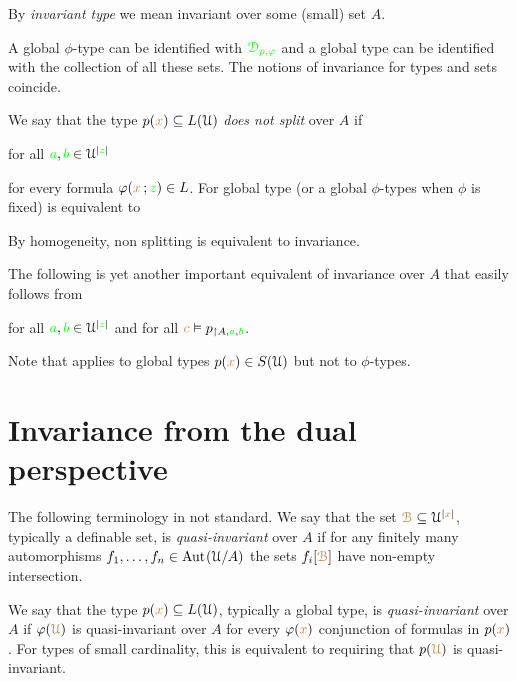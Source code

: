 \documentclass[creche.tex]{subfiles}
\begin{document}
By \emph{invariant type\/} we mean invariant over some (small) set $A$.

A global $\phi$-type can be identified with ${\color{green}\EuScript D_{p,\varphi}}$ and a global type can be identified with the collection of all these sets.
The notions of invariance for types and sets coincide.

We say that the type $p({\color{brown} x})\subseteq L(\EuScript U)$ \emph{does not split\/} over $A$ if

\hfill for all ${\color{green} a},{\color{green} b}\in\EuScript U^{|{\color{green} z}|}$

for every formula $\varphi({\color{brown} x}\,;{\color{green} z})\in L$.
For global type (or a global $\phi$-types  when $\phi$ is fixed)  is equivalent to


By homogeneity, non splitting is equivalent to invariance.

The following is yet another important equivalent of invariance over $A$ that easily follows from 

\hfill for all ${\color{green} a},{\color{green} b}\in\EuScript U^{|{\color{green} z}|}$ and for all ${\color{brown} c}\vDash p_{\restriction A,{\color{green} a},{\color{green} b}}$.

Note that  applies to global types $p({\color{brown} x})\in S(\EuScript U)$ but not to $\phi$-types.

\section{Invariance from the dual perspective}

\noindent\llap{\textcolor{red}{\Large\danger}\kern1.5ex}The following terminology in not standard.
We say that the set ${\color{brown}\EuScript B}\subseteq\EuScript U^{|{\color{brown} x}|}$, typically a definable set, is \emph{quasi-invariant\/} over $A$ if for any finitely many automorphisms $f_1,\dots,f_n\in\textrm{Aut\kern.15ex}(\EuScript U/A)$ the sets $f_i[{\color{brown}\EuScript B}]$ have non-empty intersection.

We say that the type $p({\color{brown} x})\subseteq L(\EuScript U)$, typically a global type, is \emph{quasi-invariant\/} over $A$ if $\varphi({\color{brown}\EuScript U})$ is quasi-invariant over $A$  for every $\varphi({\color{brown} x})$ conjunction of formulas in $p({\color{brown} x})$.
For types of small cardinality, this is equivalent to requiring that $p({\color{brown}\EuScript U})$ is quasi-invariant.%
\end{document}
